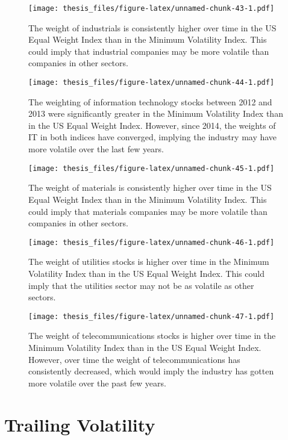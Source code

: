 \documentclass[12pt,twoside]{reedthesis}
\theoremstyle{definition}
\theoremstyle{definition}
\theoremstyle{definition}
\theoremstyle{remark}
\begin{document}
\begin{figure}[htbp]
\centering
\texttt{[image: thesis\_files/figure-latex/unnamed-chunk-43-1.pdf]}
\caption{\label{fig:unnamed-chunk-43}The weight of industrials is
consistently higher over time in the US Equal Weight Index than in the
Minimum Volatility Index. This could imply that industrial companies may
be more volatile than companies in other sectors.}
\end{figure}
\begin{figure}[htbp]
\centering
\texttt{[image: thesis\_files/figure-latex/unnamed-chunk-44-1.pdf]}
\caption{\label{fig:unnamed-chunk-44}The weighting of information technology
stocks between 2012 and 2013 were significantly greater in the Minimum
Volatility Index than in the US Equal Weight Index. However, since 2014,
the weights of IT in both indices have converged, implying the industry
may have more volatile over the last few years.}
\end{figure}
\begin{figure}[htbp]
\centering
\texttt{[image: thesis\_files/figure-latex/unnamed-chunk-45-1.pdf]}
\caption{\label{fig:unnamed-chunk-45}The weight of materials is consistently
higher over time in the US Equal Weight Index than in the Minimum
Volatility Index. This could imply that materials companies may be more
volatile than companies in other sectors.}
\end{figure}
\begin{figure}[htbp]
\centering
\texttt{[image: thesis\_files/figure-latex/unnamed-chunk-46-1.pdf]}
\caption{\label{fig:unnamed-chunk-46}The weight of utilities stocks is
higher over time in the Minimum Volatility Index than in the US Equal
Weight Index. This could imply that the utilities sector may not be as
volatile as other sectors.}
\end{figure}
\begin{figure}[htbp]
\centering
\texttt{[image: thesis\_files/figure-latex/unnamed-chunk-47-1.pdf]}
\caption{\label{fig:unnamed-chunk-47}The weight of telecommunications stocks
is higher over time in the Minimum Volatility Index than in the US Equal
Weight Index. However, over time the weight of telecommunications has
consistently decreased, which would imply the industry has gotten more
volatile over the past few years.}
\end{figure}
\clearpage 

\section{Trailing Volatility}\label{trailing-volatility}
\end{document}
